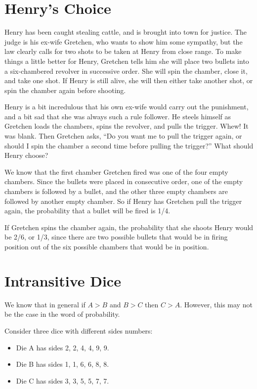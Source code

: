 \hypertarget{Henry-Choice}{%
  \section{Henry's Choice}\label{Henry-Choice}}

Henry has been caught stealing cattle, and is brought into town for justice. The
judge is his ex-wife Gretchen, who wants to show him some sympathy, but the law
clearly calls for two shots to be taken at Henry from close range. To make
things a little better for Henry, Gretchen tells him she will place two bullets
into a six-chambered revolver in successive order. She will spin the chamber,
close it, and take one shot. If Henry is still alive, she will then either take
another shot, or spin the chamber again before shooting.

Henry is a bit incredulous that his own ex-wife would carry out the punishment,
and a bit sad that she was always such a rule follower. He steels himself as
Gretchen loads the chambers, spins the revolver, and pulls the trigger. Whew! It
was blank. Then Gretchen asks, ``Do you want me to pull the trigger again, or
should I spin the chamber a second time before pulling the trigger?'' What should Henry choose?

We know that the first chamber Gretchen fired was one of the four empty
chambers. Since the bullets were placed in consecutive order, one of the empty
chambers is followed by a bullet, and the other three empty chambers are
followed by another empty chamber. So if Henry has Gretchen pull the trigger
again, the probability that a bullet will be fired is 1/4.

If Gretchen spins the chamber again, the probability that she shoots Henry would
be 2/6, or 1/3, since there are two possible bullets that would be in firing
position out of the six possible chambers that would be in position.

\hypertarget{Intransitive-Dice}{%
\section{Intransitive Dice}\label{Intransitive-Dice}}

We know that in general if $A>B$ and $B>C$ then $C>A$. However, this may not be the case in the word of probability.

Consider three dice with different sides numbers:
\begin{itemize}
\item Die A has sides 2, 2, 4, 4, 9, 9.
\item Die B has sides 1, 1, 6, 6, 8, 8.
\item Die C has sides 3, 3, 5, 5, 7, 7.
\end{itemize}


